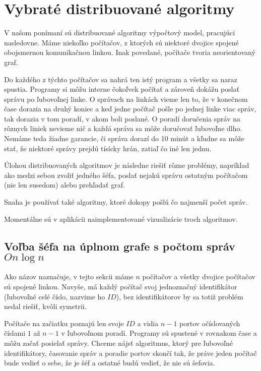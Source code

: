 \section{Vybraté distribuované algoritmy}

V našom ponímaní sú distribuované algoritmy výpočtový model, pracujúci nasledovne.
Máme niekoľko počítačov, z ktorých sú niektoré dvojice spojené obojsmernou komunikačnou linkou.
Inak povedané, počítače tvoria neorientovaný graf. 

Do každého z týchto počítačov sa nahrá ten istý program a všetky sa naraz spustia. Programy si môžu
interne čokoľvek počítať a zároveň dokážu poslať správu po ľubovoľnej linke. O správach na linkách
vieme len to, že v konečnom čase dorazia na druhý koniec a keď jedne počítač pošle po jednej linke
viac správ, tak dorazia v tom poradí, v akom boli poslané. O poradí doručenia správ na rôznych
liniek nevieme nič a každá správa sa môže doručovať ľubovoľne dlho. Nemáme teda žiadne garancie, či
správa dorazí do 10 minút a kľudne sa môže stať, že niektoré správy prejdú tísícky hrán, zatiaľ čo
iné len jednu.

Úlohou distribuovaných algoritmov je následne riešiť rôzne problémy, napríklad ako medzi sebou
zvoliť jedného šéfa, poslať nejakú správu ostatným počítačom (nie len susedom) alebo prehľadať
graf.

Snaha je používať také algoritmy, ktoré dokopy pošlú čo najmenší počet správ.

Momentálne sú v aplikácii naimplementované vizualizácie troch algoritmov.

\subsection{Voľba šéfa na úplnom grafe s počtom správ $O{n\log n}$}

Ako názov naznačuje, v tejto sekcii máme $n$ počítačov a všetky dvojice počítačov sú spojené linkou. 
Navyše, má každý počítač svoj jednoznačný identifikátor (ľubovoľné celé číslo, nazvime ho $ID$), bez identifikátorov
by sa totiž problém nedal riešiť, kvôli symetrii.

Počítače na začiatku poznajú len svoje $ID$ a vidia $n-1$ portov očíslovaných číslami $1$ až $n-1$ v
ľubovoľnom poradí. Programy sú spustené v rovnakom čase a môžu začať posielať správy.
Chceme nájsť algoritmus, ktorý pre ľubovoľné identifikátory, časovanie správ a poradie portov skončí
tak, že práve jeden počítač bude vedieť o sebe, že je šéf a ostatné budú vedieť, že nie sú šefovia.

